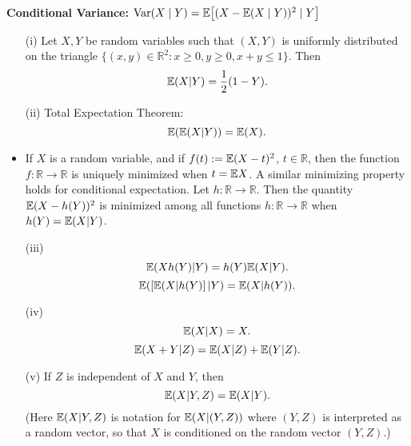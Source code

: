 \begin{definition} \textbf{Conditional Variance:} \(\mathrm{Var}(X \mid Y) = \mathbb{E}\big[ (X - \mathbb{E}(X \mid Y))^2   \mid Y\big]\)
\end{definition}

\begin{theorem}\label{prob.541Ahw.condexp.thm}
\begin{itemize}
\item[(i)] Let $X,Y$ be random variables such that $(X,Y)$ is uniformly distributed on the triangle $\{(x,y)\in\mathbb{R}^{2}: x\geq0,y\geq0,x+y\leq1\}$. Then
$$\mathbb{E}(X|Y)=\frac{1}{2}(1-Y).$$
\item[(ii)] Total Expectation Theorem:
$$\mathbb{E}(\mathbb{E}(X|Y))=\mathbb{E}(X).$$
\item If $X$ is a random variable, and if $f(t):= \mathbb{E}(X-t)^{2}$, $t\in\mathbb{R}$, then the function $f:\mathbb{R}\to\mathbb{R}$ is uniquely minimized when $t=\mathbb{E} X$.  A similar minimizing property holds for conditional expectation.  Let $h:\mathbb{R}\to\mathbb{R}$. Then the quantity $\mathbb{E}(X-h(Y))^{2}$ is minimized among all functions $h:\mathbb{R}\to\mathbb{R}$ when $h(Y)=\mathbb{E}(X|Y)$.
\item[(iii)] 
$$\mathbb{E}(Xh(Y)|Y)=h(Y)\mathbb{E}(X|Y).$$
$$\mathbb{E}([\mathbb{E} (X|h(Y)]\,|Y)=\mathbb{E} (X|h(Y)).$$
\item[(iv)] 
$$\mathbb{E} (X|X)=X.$$
$$\mathbb{E}(X+Y|Z)=\mathbb{E}(X|Z)+\mathbb{E}(Y|Z).$$
\item[(v)] If $Z$ is independent of $X$ and $Y$, then
$$\mathbb{E}(X|Y,Z)=\mathbb{E} (X|Y).$$
(Here $\mathbb{E}(X|Y,Z)$ is notation for $\mathbb{E}(X|(Y,Z))$ where $(Y,Z)$ is interpreted as a random vector, so that $X$ is conditioned on the random vector $(Y,Z)$.)
\end{itemize}
\end{theorem}

